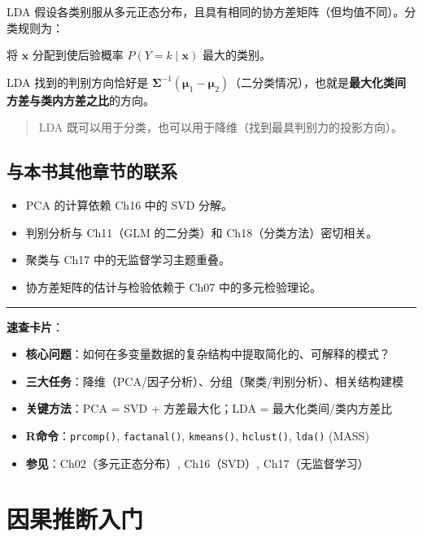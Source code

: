 \documentclass[
]{book}
\providecommand{\tightlist}{%
  \setlength{\itemsep}{0pt}\setlength{\parskip}{0pt}}
\begin{document}
LDA 假设各类别服从多元正态分布，且具有相同的协方差矩阵（但均值不同）。分类规则为：

将 \(\mathbf{x}\) 分配到使后验概率 \(P(Y = k \mid \mathbf{x})\) 最大的类别。

LDA 找到的判别方向恰好是 \(\boldsymbol{\Sigma}^{-1} (\boldsymbol{\mu}_1 - \boldsymbol{\mu}_2)\)（二分类情况），也就是\textbf{最大化类间方差与类内方差之比}的方向。

\begin{quote}
LDA 既可以用于分类，也可以用于降维（找到最具判别力的投影方向）。
\end{quote}

\section{与本书其他章节的联系}\label{ux4e0eux672cux4e66ux5176ux4ed6ux7ae0ux8282ux7684ux8054ux7cfb-1}

\begin{itemize}
\tightlist
\item
  PCA 的计算依赖 Ch16 中的 SVD 分解。
\item
  判别分析与 Ch11（GLM 的二分类）和 Ch18（分类方法）密切相关。
\item
  聚类与 Ch17 中的无监督学习主题重叠。
\item
  协方差矩阵的估计与检验依赖于 Ch07 中的多元检验理论。
\end{itemize}

\begin{center}\rule{0.5\linewidth}{0.5pt}\end{center}

\textbf{速查卡片}：

\begin{itemize}
\tightlist
\item
  \textbf{核心问题}：如何在多变量数据的复杂结构中提取简化的、可解释的模式？
\item
  \textbf{三大任务}：降维（PCA/因子分析）、分组（聚类/判别分析）、相关结构建模
\item
  \textbf{关键方法}：PCA = SVD + 方差最大化；LDA = 最大化类间/类内方差比
\item
  \textbf{R命令}：\texttt{prcomp()}, \texttt{factanal()}, \texttt{kmeans()}, \texttt{hclust()}, \texttt{lda()} (MASS)
\item
  \textbf{参见}：Ch02（多元正态分布）, Ch16（SVD）, Ch17（无监督学习）
\end{itemize}

\chapter{因果推断入门}\label{ux56e0ux679cux63a8ux65adux5165ux95e8}
\end{document}
